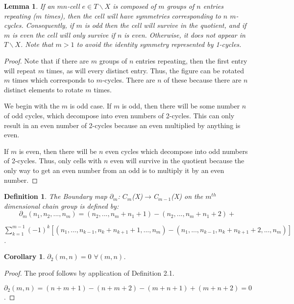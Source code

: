 \documentclass{amsart}
\newtheorem{Definition}[theorem]{Definition}
\newtheorem{lemma}[theorem]{Lemma}
\newtheorem{corollary}[theorem]{Corollary}
\begin{document}
\begin{lemma}
	If an $mn$-cell $e \in T\backslash X$ is composed of $m$ groups of $n$ entries repeating ($m$ times), then the cell will have symmetries corresponding to $n$ $m$-cycles. Consequently, if $m$ is odd then the cell will survive in the quotient, and if $m$ is even the cell will only survive if $n$ is even. Otherwise, it does not appear in $T \backslash X$. Note that $m>1$ to avoid the identity symmetry represented by 1-cycles.
\end{lemma}

\begin{proof}
	Note that if there are $m$ groups of $n$ entries repeating, then the first entry will repeat $m$ times, as will every distinct entry. Thus, the figure can be rotated $m$ times which corresponds to $m$-cycles. There are $n$ of these because there are $n$ distinct elements to rotate $m$ times.
	
	We begin with the $m$ is odd case. If $m$ is odd, then there will be some number $n$ of odd cycles, which decompose into even numbers of 2-cycles. This can only result in an even number of 2-cycles because an even multiplied by anything is even.
	
	If $m$ is even, then there will be $n$ even cycles which decompose into odd numbers of 2-cycles. Thus, only cells with $n$ even will survive in the quotient because the only way to get an even number from an odd is to multiply it by an even number.
\end{proof}

\begin{Definition} The Boundary map $\partial_{m}$:    $C_{m}$(X)$\to$C$_{m-1}$(X) on the $m^{th}$ dimensional chain group is defined by:\\
	$$\partial_{m}(n_{1},n_{2},...,n_{m}) = (n_{2},...,n_{m}+n_{1}+1)-(n_{2},...,n_{m}+n_{1}+2)+$$ 
	
	$\sum_{k=1}^{m-1}(-1)^{k}[(n_{1},...,n_{k-1},n_{k}+n_{k+1}+1,...,n_{m})-
	(n_{1},...,n_{k-1},n_{k}+n_{k+1}+2,...,n_{m})]$.
	
\end{Definition}

\begin{corollary}
	$\partial_{2}(m,n) = 0$ $ \forall (m,n)$.
\end{corollary}
	\begin{proof}
		The proof follows by application of Definition 2.1.
		
		\bigskip
		
		$\partial_{2}(m,n) = (n+m+1) - (n+m+2) - (m+n+1) + (m+n+2) = 0$.
	\end{proof}
\end{document}

